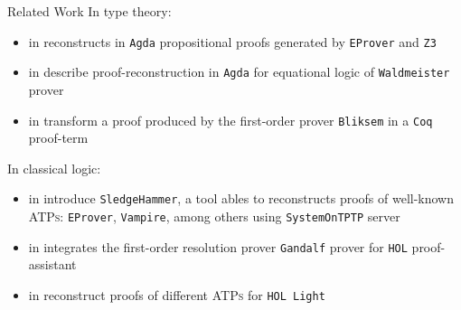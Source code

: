 \documentclass[10pt, xetex, hyperref={pdfpagelabels=false}]{beamer}
\newcommand{\abbre}[1]{\textsc{#1}\xspace}
\newcommand{\ATPs}{\abbre{ATPs}}
\newcommand{\name}[1]{\texttt{#1}\xspace}
\newcommand{\prg}[1]{\texttt{#1}\xspace}
\newcommand{\Agda}{\prg{Agda}}
\begin{document}
\begin{frame}{Related Work}
In type theory:
\begin{itemize}
  \item \citeauthor{Kanso2012} in \cite{Kanso2012} reconstructs in \Agda propositional proofs generated by \name{EProver} and \name{Z3}
  \item \citeauthor{foster2011integrating} in \cite{foster2011integrating}
  describe proof-reconstruction in \Agda for equational logic of \name{Waldmeister} prover
  \item \citeauthor{Bezem2002} in \cite{Bezem2002} transform a proof produced by the first-order prover \name{Bliksem} in a \name{Coq} proof-term
\end{itemize}
In classical logic:
\begin{itemize}
\item \citeauthor{paulson2007source} in \cite{paulson2007source} introduce
\name{SledgeHammer}, a tool ables to reconstructs proofs of well-known \ATPs: \name{EProver}, \name{Vampire}, among others using \name{SystemOnTPTP} server
\item \citeauthor{Hurd1999} in \cite{Hurd1999} integrates the first-order resolution prover \name{Gandalf} prover for \name{HOL} proof-assistant
\item \citeauthor{kaliszyk2013} in \cite{kaliszyk2013} reconstruct proofs
of different \ATPs for \name{HOL Light}
\end{itemize}
\end{frame}
\end{document}
